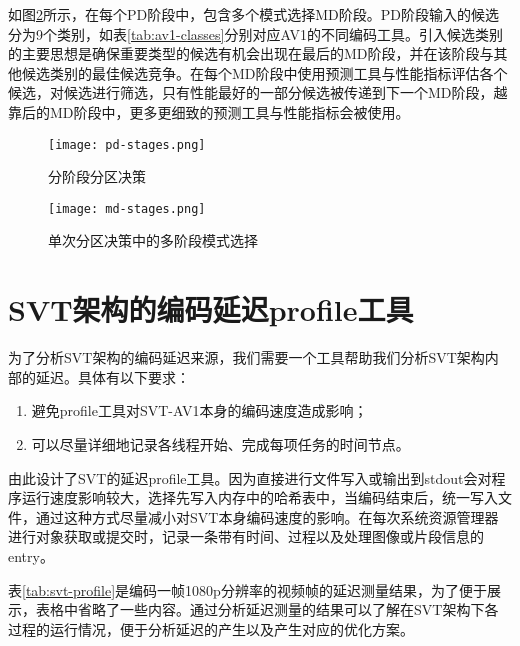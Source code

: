   如图\ref{fig:md}所示，在每个PD阶段中，包含多个模式选择MD阶段。PD阶段输入的候选分为9个类别，如表\ref{tab:av1-classes}分别对应AV1的不同编码工具。引入候选类别的主要思想是确保重要类型的候选有机会出现在最后的MD阶段，并在该阶段与其他候选类别的最佳候选竞争。在每个MD阶段中使用预测工具与性能指标评估各个候选，对候选进行筛选，只有性能最好的一部分候选被传递到下一个MD阶段，越靠后的MD阶段中，更多更细致的预测工具与性能指标会被使用。



  \begin{figure}[!htp]
    \centering
    \texttt{[image: pd-stages.png]}
    \caption{分阶段分区决策\cite{EncoderDesignSVTAV1}}
  \label{fig:pd}
  \end{figure}

  \begin{figure}[!htp]
    \centering
    \texttt{[image: md-stages.png]}
    \caption{单次分区决策中的多阶段模式选择\cite{EncoderDesignSVTAV1}}
  \label{fig:md}
  \end{figure}
\section{SVT架构的编码延迟profile工具} \label{sec:svt-profile}
  为了分析SVT架构的编码延迟来源，我们需要一个工具帮助我们分析SVT架构内部的延迟。具体有以下要求：
  \begin{enumerate} [label=\arabic*)]
    \item 避免profile工具对SVT-AV1本身的编码速度造成影响；
    \item 可以尽量详细地记录各线程开始、完成每项任务的时间节点。
  \end{enumerate}

  由此设计了SVT的延迟profile工具。因为直接进行文件写入或输出到stdout会对程序运行速度影响较大，选择先写入内存中的哈希表中，当编码结束后，统一写入文件，通过这种方式尽量减小对SVT本身编码速度的影响。在每次系统资源管理器进行对象获取或提交时，记录一条带有时间、过程以及处理图像或片段信息的entry。

  表\ref{tab:svt-profile}是编码一帧1080p分辨率的视频帧的延迟测量结果，为了便于展示，表格中省略了一些内容。通过分析延迟测量的结果可以了解在SVT架构下各过程的运行情况，便于分析延迟的产生以及产生对应的优化方案。

